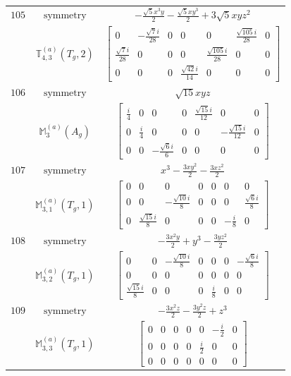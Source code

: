 \documentclass[fleqn,8pt,landscape]{jsarticle}
\begin{document}
\begin{longtable}{ccc}
$ 105 $ & $ \text{symmetry} $ & $ - \frac{\sqrt{5} x^{3} y}{2} - \frac{\sqrt{5} x y^{3}}{2} + 3 \sqrt{5} x y z^{2} $ \\
$  $ & $ \mathbb{T}_{4,3}^{(a)}(T_{g},2) $ & $ \begin{bmatrix} 0 & - \frac{\sqrt{7} i}{28} & 0 & 0 & 0 & \frac{\sqrt{105} i}{28} & 0 \\ \frac{\sqrt{7} i}{28} & 0 & 0 & 0 & \frac{\sqrt{105} i}{28} & 0 & 0 \\ 0 & 0 & 0 & \frac{\sqrt{42} i}{14} & 0 & 0 & 0 \end{bmatrix} $ \\ \hline
$ 106 $ & $ \text{symmetry} $ & $ \sqrt{15} x y z $ \\
$  $ & $ \mathbb{M}_{3}^{(a)}(A_{g}) $ & $ \begin{bmatrix} \frac{i}{4} & 0 & 0 & 0 & \frac{\sqrt{15} i}{12} & 0 & 0 \\ 0 & \frac{i}{4} & 0 & 0 & 0 & - \frac{\sqrt{15} i}{12} & 0 \\ 0 & 0 & - \frac{\sqrt{6} i}{6} & 0 & 0 & 0 & 0 \end{bmatrix} $ \\ \hline
$ 107 $ & $ \text{symmetry} $ & $ x^{3} - \frac{3 x y^{2}}{2} - \frac{3 x z^{2}}{2} $ \\
$  $ & $ \mathbb{M}_{3,1}^{(a)}(T_{g},1) $ & $ \begin{bmatrix} 0 & 0 & 0 & 0 & 0 & 0 & 0 \\ 0 & 0 & - \frac{\sqrt{10} i}{8} & 0 & 0 & 0 & \frac{\sqrt{6} i}{8} \\ 0 & \frac{\sqrt{15} i}{8} & 0 & 0 & 0 & - \frac{i}{8} & 0 \end{bmatrix} $ \\ \hline
$ 108 $ & $ \text{symmetry} $ & $ - \frac{3 x^{2} y}{2} + y^{3} - \frac{3 y z^{2}}{2} $ \\
$  $ & $ \mathbb{M}_{3,2}^{(a)}(T_{g},1) $ & $ \begin{bmatrix} 0 & 0 & - \frac{\sqrt{10} i}{8} & 0 & 0 & 0 & - \frac{\sqrt{6} i}{8} \\ 0 & 0 & 0 & 0 & 0 & 0 & 0 \\ \frac{\sqrt{15} i}{8} & 0 & 0 & 0 & \frac{i}{8} & 0 & 0 \end{bmatrix} $ \\ \hline
$ 109 $ & $ \text{symmetry} $ & $ - \frac{3 x^{2} z}{2} - \frac{3 y^{2} z}{2} + z^{3} $ \\
$  $ & $ \mathbb{M}_{3,3}^{(a)}(T_{g},1) $ & $ \begin{bmatrix} 0 & 0 & 0 & 0 & 0 & - \frac{i}{2} & 0 \\ 0 & 0 & 0 & 0 & \frac{i}{2} & 0 & 0 \\ 0 & 0 & 0 & 0 & 0 & 0 & 0 \end{bmatrix} $ \\ \hline

\end{longtable}
\end{document}
